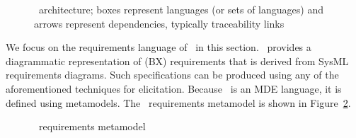 \begin{figure}[htbp]
\caption{\transml\ architecture; boxes represent languages (or sets of languages) and arrows represent dependencies, typically traceability links}
\label{fig:transML}
\end{figure}

We focus on the requirements language of \transml\ in this section. \transml\ provides a diagrammatic representation of (BX) requirements that is derived from SysML requirements diagrams. Such specifications can be produced using any of the aforementioned techniques for elicitation. Because \transml\ is an MDE language, it is defined using metamodels. The \transml\  requirements metamodel is shown in Figure~\ref{fig:transml-requirements}.

\begin{figure}[htbp]
\caption{\transml\ requirements metamodel}
\label{fig:transml-requirements}
\end{figure}

